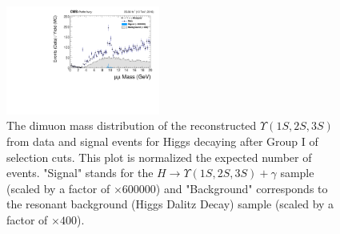 \begin{figure}[!htbp]
\begin{center}
\includegraphics[width=0.45\textwidth]{figures_and_tables/outputPlots/HtoUpsilon_Cat0_ZZZZZ/nEvts/data_x_mc/noKinCuts/h_noKin_Upsilon_Mass_Signal_and_Background_LargeRange}\hspace*{1.cm}
\end{center}\vspace*{-.5cm}
\caption{The dimuon mass distribution of the reconstructed $\Upsilon (1S,2S,3S)$ from data and signal events for Higgs decaying after Group I of selection cuts. This plot is normalized the expected number of events.  "Signal" stands for the $H \rightarrow \Upsilon (1S,2S,3S) + \gamma$ sample (scaled by a factor of $\times 600000$) and "Background" corresponds to the resonant background (Higgs Dalitz Decay) sample (scaled by a factor of $\times 400$).}
\label{fig:dimuon_mass_HtoUpsilon_Cat0}
\end{figure}

